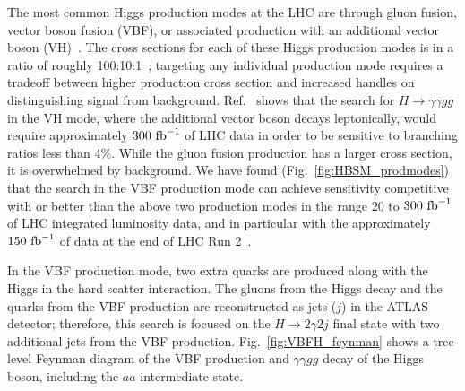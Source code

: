 The most common Higgs production modes at the LHC are through gluon fusion, vector boson fusion (VBF), or associated production with an additional vector boson (VH)~\cite{Dittmaier:2011ti}.
The cross sections for each of these Higgs production modes is in a ratio of roughly 100:10:1~\cite{deFlorian:2016spz,TODO}; targeting any individual production mode requires a tradeoff between higher production cross section and increased handles on distinguishing signal from background.
Ref.~\cite{hep-ph/0703247} shows that the search for $H \to \gamma\gamma gg$ in the VH mode, 
where the additional vector boson
decays leptonically, would require approximately $300~\mathrm{fb}^{-1}$ of LHC data in order to be sensitive to branching ratios less than 4\%. 
While the gluon fusion production has a larger cross section, it is overwhelmed by background.
We have found (Fig.~\ref{fig:HBSM_prodmodes}) that the search in the VBF production 
mode can achieve sensitivity competitive with or better than the above two production modes in the range $20$ to $300~\mathrm{fb}^{-1}$ of LHC integrated luminosity data,
and in particular with the approximately $150~\mathrm{fb}^{-1}$ of data at the end of LHC Run 2~\cite{lhc-commissioning}.

In the VBF production mode, two extra quarks are produced along with the Higgs in the hard scatter interaction.
The gluons from the Higgs decay and the quarks from the VBF production are reconstructed as jets ($j$) in the ATLAS detector;
therefore, this search is focused on the $H\to2\gamma2j$ final state with two additional jets from the VBF production.
Fig.~\ref{fig:VBFH_feynman} shows a tree-level Feynman diagram of the VBF production and $\gamma\gamma gg$ decay of the Higgs boson, including the $aa$ intermediate state.

